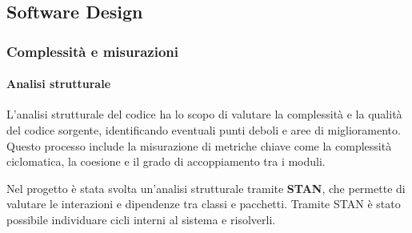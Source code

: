 \documentclass[a4paper,12pt]{article}
\begin{document}
\subsection{Software Design}
\subsubsection{Complessità e misurazioni}
\paragraph{Analisi strutturale}\leavevmode\par

L'analisi strutturale del codice ha lo scopo di valutare la complessità e la qualità del codice sorgente, identificando eventuali punti deboli e aree di miglioramento. Questo processo include la misurazione di metriche chiave come la complessità ciclomatica, la coesione e il grado di accoppiamento tra i moduli. 

Nel progetto è stata svolta un'analisi strutturale tramite \textbf{STAN}, che permette di valutare le interazioni e dipendenze tra classi e pacchetti.
Tramite STAN è stato possibile individuare cicli interni al sistema e risolverli. 
\end{document}

